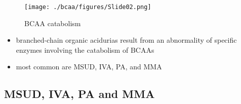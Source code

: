\documentclass{scrartcl}
\begin{document}
\begin{figure}[htbp]
\centering
\texttt{[image: ./bcaa/figures/Slide02.png]}
\caption{\label{fig:org5f104b2}
BCAA catabolism}
\end{figure}

\begin{itemize}
\item branched-chain organic acidurias result from an abnormality of
specific enzymes involving the catabolism of BCAAs
\item most common are MSUD, IVA, PA, and MMA
\end{itemize}

\subsection{MSUD, IVA, PA and MMA}
\label{sec:orgbcd5ad3}
\end{document}
